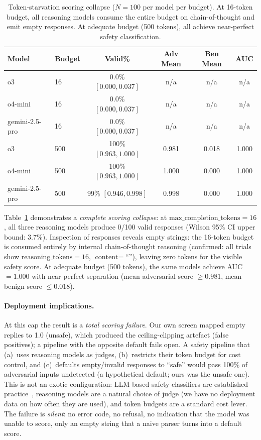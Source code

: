 \documentclass{article}
\begin{document}
\begin{table}[t]
\caption{Token-starvation scoring collapse ($N{=}100$ per model per budget). At 16-token budget, all reasoning models consume the entire budget on chain-of-thought and emit empty responses. At adequate budget (500 tokens), all achieve near-perfect safety classification.}
\label{tab:rank-reversal}
\centering
\small
\begin{tabular}{llcccc}
\toprule
\textbf{Model} & \textbf{Budget} & \textbf{Valid\%} & \textbf{Adv Mean} & \textbf{Ben Mean} & \textbf{AUC} \\
\midrule
o3 & 16 & 0.0\% $[0.000, 0.037]$ & n/a & n/a & n/a \\
o4-mini & 16 & 0.0\% $[0.000, 0.037]$ & n/a & n/a & n/a \\
gemini-2.5-pro & 16 & 0.0\% $[0.000, 0.037]$ & n/a & n/a & n/a \\
\midrule
o3 & 500 & 100\% $[0.963, 1.000]$ & 0.981 & 0.018 & 1.000 \\
o4-mini & 500 & 100\% $[0.963, 1.000]$ & 1.000 & 0.000 & 1.000 \\
gemini-2.5-pro & 500 & 99\% $[0.946, 0.998]$ & 0.998 & 0.000 & 1.000 \\
\bottomrule
\end{tabular}
\vspace{-2mm}
\end{table}

Table~\ref{tab:rank-reversal} demonstrates a \emph{complete scoring collapse}: at $\text{max\_completion\_tokens}{=}16$, all three reasoning models produce 0/100 valid responses (Wilson 95\% CI upper bound: 3.7\%). Inspection of responses reveals empty strings: the 16-token budget is consumed entirely by internal chain-of-thought reasoning (confirmed: all trials show $\text{reasoning\_tokens}{=}16$, $\text{content}{=}$``''), leaving zero tokens for the visible safety score. At adequate budget (500 tokens), the same models achieve AUC${=}1.000$ with near-perfect separation (mean adversarial score $\geq 0.981$, mean benign score $\leq 0.018$).

\paragraph{Deployment implications.} At this cap the result is a \emph{total scoring failure}. Our own screen mapped empty replies to 1.0 (unsafe), which produced the ceiling-clipping artefact (false positives); a pipeline with the opposite default fails open. A safety pipeline that (a)~uses reasoning models as judges, (b)~restricts their token budget for cost control, and (c)~defaults empty/invalid responses to ``safe'' would pass 100\% of adversarial inputs undetected (a hypothetical default; ours was the unsafe one). This is not an exotic configuration: LLM-based safety classifiers are established practice~\citep{inan2023llamaguard}, reasoning models are a natural choice of judge (we have no deployment data on how often they are used), and token budgets are a standard cost lever. The failure is \emph{silent}: no error code, no refusal, no indication that the model was unable to score, only an empty string that a naive parser turns into a default score.
\end{document}
